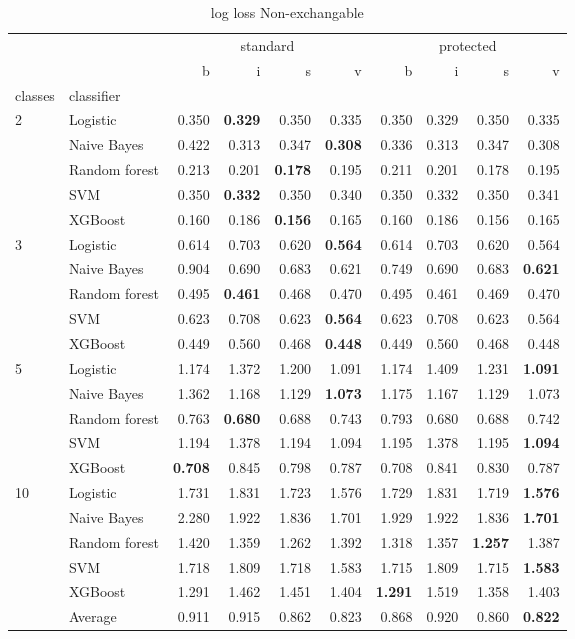 \begin{table}
\caption{log loss Non-exchangable}
\begin{tabular}{l|l|rrrr|rrrr}
\toprule
 &  & \multicolumn{4}{c}{standard} & \multicolumn{4}{c}{protected} \\
 &  & b & i & s & v & b & i & s & v \\
classes & classifier &  &  &  &  &  &  &  &  \\
\midrule
\midrule
\multirow[c]{5}{*}{2} & Logistic & 0.350 & \textbf{0.329} & 0.350 & 0.335 & 0.350 & 0.329 & 0.350 & 0.335 \\
 & Naive Bayes & 0.422 & 0.313 & 0.347 & \textbf{0.308} & 0.336 & 0.313 & 0.347 & 0.308 \\
 & Random forest & 0.213 & 0.201 & \textbf{0.178} & 0.195 & 0.211 & 0.201 & 0.178 & 0.195 \\
 & SVM & 0.350 & \textbf{0.332} & 0.350 & 0.340 & 0.350 & 0.332 & 0.350 & 0.341 \\
 & XGBoost & 0.160 & 0.186 & \textbf{0.156} & 0.165 & 0.160 & 0.186 & 0.156 & 0.165 \\
\midrule
\multirow[c]{5}{*}{3} & Logistic & 0.614 & 0.703 & 0.620 & \textbf{0.564} & 0.614 & 0.703 & 0.620 & 0.564 \\
 & Naive Bayes & 0.904 & 0.690 & 0.683 & 0.621 & 0.749 & 0.690 & 0.683 & \textbf{0.621} \\
 & Random forest & 0.495 & \textbf{0.461} & 0.468 & 0.470 & 0.495 & 0.461 & 0.469 & 0.470 \\
 & SVM & 0.623 & 0.708 & 0.623 & \textbf{0.564} & 0.623 & 0.708 & 0.623 & 0.564 \\
 & XGBoost & 0.449 & 0.560 & 0.468 & \textbf{0.448} & 0.449 & 0.560 & 0.468 & 0.448 \\
\midrule
\multirow[c]{5}{*}{5} & Logistic & 1.174 & 1.372 & 1.200 & 1.091 & 1.174 & 1.409 & 1.231 & \textbf{1.091} \\
 & Naive Bayes & 1.362 & 1.168 & 1.129 & \textbf{1.073} & 1.175 & 1.167 & 1.129 & 1.073 \\
 & Random forest & 0.763 & \textbf{0.680} & 0.688 & 0.743 & 0.793 & 0.680 & 0.688 & 0.742 \\
 & SVM & 1.194 & 1.378 & 1.194 & 1.094 & 1.195 & 1.378 & 1.195 & \textbf{1.094} \\
 & XGBoost & \textbf{0.708} & 0.845 & 0.798 & 0.787 & 0.708 & 0.841 & 0.830 & 0.787 \\
\midrule
\multirow[c]{5}{*}{10} & Logistic & 1.731 & 1.831 & 1.723 & 1.576 & 1.729 & 1.831 & 1.719 & \textbf{1.576} \\
 & Naive Bayes & 2.280 & 1.922 & 1.836 & 1.701 & 1.929 & 1.922 & 1.836 & \textbf{1.701} \\
 & Random forest & 1.420 & 1.359 & 1.262 & 1.392 & 1.318 & 1.357 & \textbf{1.257} & 1.387 \\
 & SVM & 1.718 & 1.809 & 1.718 & 1.583 & 1.715 & 1.809 & 1.715 & \textbf{1.583} \\
 & XGBoost & 1.291 & 1.462 & 1.451 & 1.404 & \textbf{1.291} & 1.519 & 1.358 & 1.403 \\\midrule\ & Average & 0.911 & 0.915 & 0.862 & 0.823 & 0.868 & 0.920 & 0.860 & \textbf{0.822} \\
\bottomrule
\end{tabular}
\end{table}
